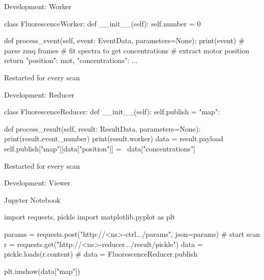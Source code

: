 \documentclass[aspectratio=169]{beamer}
\begin{document}
\begin{frame}[fragile]{Development: Worker}
  \begin{python}
class FluorescenceWorker:
    def __init__(self):
        self.number = 0
    
    def process_event(self, 
                      event: EventData, 
                      parameters=None):
        print(event)
        # parse zmq frames
        # fit spectra to get concentrations
        # extract motor position
        return {"position": mot, "concentrations": ...}
\end{python}
 
Restarted for every scan
\end{frame}

\begin{frame}[fragile]{Development: Reducer}
 \begin{python}
class FluorescenceReducer:
    def __init__(self):
        self.publish = {"map": {}}
    
    def process_result(self, 
                      result: ResultData, 
                      parameters=None):
        print(result.event_number)
        print(result.worker)
        data = result.payload
        self.publish["map"][data["position"]] = \
                data["concentrations"]
\end{python}

Restarted for every scan

\end{frame}

\begin{frame}[fragile]{Development: Viewer}
 \begin{block}{Jupyter Notebook}
  \begin{python}
import requests, pickle
import matplotlib.pyplot as plt

params = {}
requests.post("http://<ns>-ctrl.../params", json=params)
# start scan
r = requests.get("http://<ns>-reducer.../result/pickle")
data = pickle.loads(r.content)
# data = FluorescenceReducer.publish

plt.imshow(data["map"])
  \end{python}

 \end{block}

\end{frame}
\end{document}
